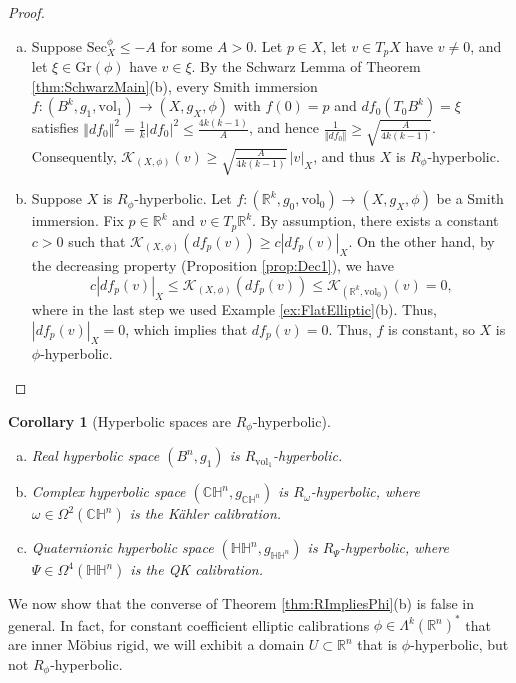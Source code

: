 \documentclass[11pt]{article}
\newcommand{\R}{\mathbb{R}}
\newcommand{\vol}{\mathrm{vol}}
\newtheorem{cor}[thm]{Corollary}
\theoremstyle{definition}
\numberwithin{equation}{section}
\begin{document}
\begin{proof} ${}$
\begin{enumerate}[(a)]
\item Suppose $\mathrm{Sec}^\phi_X \leq -A$ for some $A > 0$.  Let $p \in X$, let $v \in T_pX$ have $v \neq 0$, and let $\xi \in \mathrm{Gr}(\phi)$ have $v \in \xi$.  By the Schwarz Lemma of Theorem \ref{thm:SchwarzMain}(b), every Smith immersion $f \colon (B^k, g_1, \vol_1) \to (X, g_X, \phi)$ with $f(0) = p$ and $df_0(T_0B^k) = \xi$ satisfies $\Vert df_0 \Vert^2 = \frac{1}{k}|df_0|^2 \leq \frac{4k(k-1)}{A}$, and hence $\frac{1}{\Vert df_0\Vert } \geq \sqrt{\frac{A}{4k(k-1)}}$.   Consequently, $\mathcal{K}_{(X,\phi)}(v) \geq \sqrt{ \frac{A}{4k(k-1)} }\, |v|_X$, and thus $X$ is $R_\phi$-hyperbolic.
\item Suppose $X$ is $R_\phi$-hyperbolic.  Let $f \colon (\R^k, g_0, \vol_0) \to (X, g_X, \phi)$ be a Smith immersion.  Fix $p \in \R^k$ and $v \in T_p \R^k$.  By assumption, there exists a constant $c > 0$ such that $\mathcal{K}_{(X,\phi)}(df_p(v)) \geq c |df_p(v)|_X$.  On the other hand, by the decreasing property (Proposition \ref{prop:Dec1}), we have
$$c |df_p(v)|_X \leq \mathcal{K}_{(X, \phi)}(df_p(v)) \leq \mathcal{K}_{(\R^k, \vol_0)}(v) = 0,$$
where in the last step we used Example \ref{ex:FlatElliptic}(b).  Thus, $|df_p(v)|_X = 0$, which implies that $df_p(v) = 0$.  Thus, $f$ is constant, so $X$ is $\phi$-hyperbolic.
\end{enumerate}
\end{proof}

\begin{cor}[Hyperbolic spaces are $R_\phi$-hyperbolic] \label{prop:HypSpacesRphi} ${}$
\begin{enumerate}[(a)]
\item Real hyperbolic space $(B^n, g_1)$ is $R_{\vol_1}$-hyperbolic.
\item Complex hyperbolic space $(\mathbb{CH}^n, g_{\mathbb{CH}^n})$ is $R_{\omega}$-hyperbolic, where $\omega \in \Omega^2(\mathbb{CH}^n)$ is the K\"{a}hler calibration.
\item Quaternionic hyperbolic space $(\mathbb{HH}^n, g_{\mathbb{HH}^n})$ is $R_{\Psi}$-hyperbolic, where $\Psi \in \Omega^4(\mathbb{HH}^n)$ is the QK calibration.
\end{enumerate}
\end{cor}

\indent We now show that the converse of Theorem \ref{thm:RImpliesPhi}(b) is false in general.  In fact, for constant coefficient elliptic calibrations $\phi \in \Lambda^k(\R^n)^*$ that are inner M\"{o}bius rigid, we will exhibit a domain $U \subset \R^n$ that is $\phi$-hyperbolic, but not $R_\phi$-hyperbolic.
\end{document}
